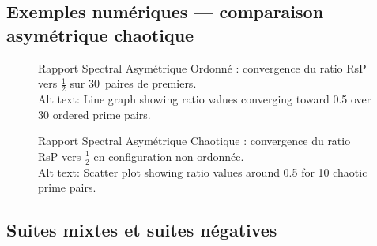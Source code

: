 \documentclass[]{pasj02}
\begin{document}
\subsection{Exemples numériques --- comparaison asymétrique chaotique}
\label{ssec:chaotique}
\label{hol:rsp_asym_chaotique}

\begin{figure}
  \begin{center}
  \end{center}
  \caption{Rapport Spectral Asymétrique Ordonné : convergence du ratio RsP
    vers $\tfrac{1}{2}$ sur 30~paires de premiers.\\
    Alt text: Line graph showing ratio values converging toward 0.5 over 30
    ordered prime pairs.}
  \label{fig:rsp_ordonne}
\end{figure}

\begin{figure}
  \begin{center}
  \end{center}
  \caption{Rapport Spectral Asymétrique Chaotique : convergence du ratio RsP
    vers $\tfrac{1}{2}$ en configuration non ordonnée.\\
    Alt text: Scatter plot showing ratio values around 0.5 for 10 chaotic
    prime pairs.}
  \label{fig:rsp_chaotique}
\end{figure}

\subsection{Suites mixtes et suites négatives}
\label{ssec:mixtes}
\label{hol:suites_mixtes_negatives}
\end{document}
